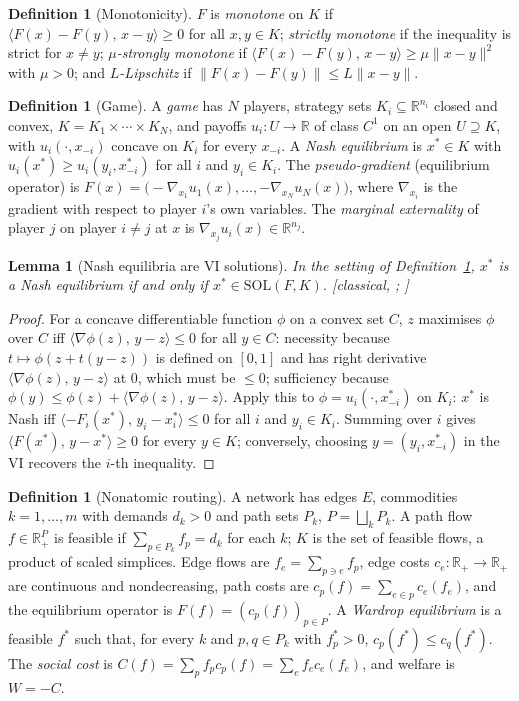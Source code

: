 \documentclass[11pt,a4paper]{article}
\theoremstyle{plain}
\newtheorem{lemma}[theorem]{Lemma}
\theoremstyle{definition}
\newtheorem{definition}[theorem]{Definition}
\theoremstyle{remark}
\newcommand{\R}{\mathbb{R}}
\newcommand{\SOL}{\mathrm{SOL}}
\newcommand{\ip}[2]{\langle #1,\,#2\rangle}
\newcommand{\status}[1]{\textsf{\small [#1]}}
\begin{document}
\begin{definition}[Monotonicity]
$F$ is \emph{monotone} on $K$ if $\ip{F(x)-F(y)}{x-y}\ge 0$ for all $x,y\in K$; \emph{strictly monotone} if the inequality is strict for $x\ne y$; \emph{$\mu$-strongly monotone} if $\ip{F(x)-F(y)}{x-y}\ge\mu\|x-y\|^2$ with $\mu>0$; and \emph{$L$-Lipschitz} if $\|F(x)-F(y)\|\le L\|x-y\|$.
\end{definition}

\begin{definition}[Game]\label{def:game}
A \emph{game} has $N$ players, strategy sets $K_i\subseteq\R^{n_i}$ closed and convex, $K=K_1\times\cdots\times K_N$, and payoffs $u_i\colon U\to\R$ of class $C^1$ on an open $U\supseteq K$, with $u_i(\cdot,x_{-i})$ concave on $K_i$ for every $x_{-i}$. A \emph{Nash equilibrium} is $x^*\in K$ with $u_i(x^*)\ge u_i(y_i,x^*_{-i})$ for all $i$ and $y_i\in K_i$. The \emph{pseudo-gradient} (equilibrium operator) is $F(x)=\big(-\nabla_{x_1}u_1(x),\dots,-\nabla_{x_N}u_N(x)\big)$, where $\nabla_{x_i}$ is the gradient with respect to player $i$'s own variables. The \emph{marginal externality} of player $j$ on player $i\ne j$ at $x$ is $\nabla_{x_j}u_i(x)\in\R^{n_j}$.
\end{definition}

\begin{lemma}[Nash equilibria are VI solutions]\label{lem:nash}
In the setting of Definition~\ref{def:game}, $x^*$ is a Nash equilibrium if and only if $x^*\in\SOL(F,K)$. \status{classical, \citealp{rosen1965}; \citealp{facchineiPang2003}}
\end{lemma}
\begin{proof}
For a concave differentiable function $\phi$ on a convex set $C$, $z$ maximises $\phi$ over $C$ iff $\ip{\nabla\phi(z)}{y-z}\le 0$ for all $y\in C$: necessity because $t\mapsto\phi(z+t(y-z))$ is defined on $[0,1]$ and has right derivative $\ip{\nabla\phi(z)}{y-z}$ at $0$, which must be $\le 0$; sufficiency because $\phi(y)\le\phi(z)+\ip{\nabla\phi(z)}{y-z}$. Apply this to $\phi=u_i(\cdot,x^*_{-i})$ on $K_i$: $x^*$ is Nash iff $\ip{-F_i(x^*)}{y_i-x_i^*}\le 0$ for all $i$ and $y_i\in K_i$. Summing over $i$ gives $\ip{F(x^*)}{y-x^*}\ge 0$ for every $y\in K$; conversely, choosing $y=(y_i,x^*_{-i})$ in the VI recovers the $i$-th inequality.
\end{proof}

\begin{definition}[Nonatomic routing]\label{def:wardrop}
A network has edges $E$, commodities $k=1,\dots,m$ with demands $d_k>0$ and path sets $P_k$, $P=\bigsqcup_k P_k$. A path flow $f\in\R^P_+$ is feasible if $\sum_{p\in P_k}f_p=d_k$ for each $k$; $K$ is the set of feasible flows, a product of scaled simplices. Edge flows are $f_e=\sum_{p\ni e}f_p$, edge costs $c_e\colon\R_+\to\R_+$ are continuous and nondecreasing, path costs are $c_p(f)=\sum_{e\in p}c_e(f_e)$, and the equilibrium operator is $F(f)=(c_p(f))_{p\in P}$. A \emph{Wardrop equilibrium} is a feasible $f^*$ such that, for every $k$ and $p,q\in P_k$ with $f^*_p>0$, $c_p(f^*)\le c_q(f^*)$. The \emph{social cost} is $C(f)=\sum_{p}f_pc_p(f)=\sum_e f_ec_e(f_e)$, and welfare is $W=-C$.
\end{definition}
\end{document}
